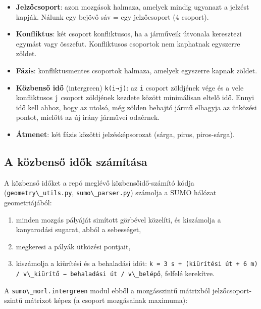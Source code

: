 \begin{itemize}
\tightlist
\item
  \textbf{Jelzőcsoport}: azon mozgások
  halmaza, amelyek mindig ugyanazt a
  jelzést kapják. Nálunk egy bejövő sáv
  = egy jelzőcsoport (4 csoport).
\item
  \textbf{Konfliktus}: két csoport
  konfliktusos, ha a járműveik útvonala
  keresztezi egymást vagy összefut.
  Konfliktusos csoportok nem kaphatnak
  egyszerre zöldet.
\item
  \textbf{Fázis}: konfliktusmentes
  csoportok halmaza, amelyek egyszerre
  kapnak zöldet.
\item
  \textbf{Közbenső idő} (intergreen)
  \passthrough{\lstinline!k(i→j)!}: az
  \passthrough{\lstinline!i!} csoport
  zöldjének vége és a vele konfliktusos
  \passthrough{\lstinline!j!} csoport
  zöldjének kezdete között minimálisan
  eltelő idő. Ennyi idő kell ahhoz, hogy
  az utolsó, még zölden behajtó jármű
  elhagyja az ütközési pontot, mielőtt
  az új irány járművei odaérnek.
\item
  \textbf{Átmenet}: két fázis közötti
  jelzésképsorozat (sárga, piros,
  piros-sárga).
\end{itemize}

\hypertarget{a-kuxf6zbensux151-idux151k-szuxe1muxedtuxe1sa}{%
\subsection{A közbenső idők
számítása}\label{a-kuxf6zbensux151-idux151k-szuxe1muxedtuxe1sa}}

A közbenső időket a repó meglévő
közbensőidő-számító kódja
(\passthrough{\lstinline!geometry\_utils.py!},
\passthrough{\lstinline!sumo\_parser.py!})
számolja a SUMO hálózat geometriájából:

\begin{enumerate}
\def\labelenumi{\arabic{enumi}.}
\tightlist
\item
  minden mozgás pályáját simított
  görbével közelíti, és kiszámolja a
  kanyarodási sugarat, abból a
  sebességet,
\item
  megkeresi a pályák ütközési pontjait,
\item
  kiszámolja a kiürítési és a behaladási
  időt:
  \passthrough{\lstinline!k = 3 s + (kiürítési út + 6 m) / v\_kiürítő − behaladási út / v\_belépő!},
  felfelé kerekítve.
\end{enumerate}

A
\passthrough{\lstinline!sumo\_morl.intergreen!}
modul ebből a mozgásszintű mátrixból
jelzőcsoport-szintű mátrixot képez (a
csoport mozgásainak maximuma):

